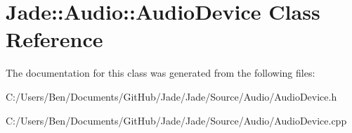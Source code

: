\hypertarget{class_jade_1_1_audio_1_1_audio_device}{}\section{Jade\+:\+:Audio\+:\+:Audio\+Device Class Reference}
\label{class_jade_1_1_audio_1_1_audio_device}


The documentation for this class was generated from the following files\+:\begin{DoxyCompactItemize}
\item 
C\+:/\+Users/\+Ben/\+Documents/\+Git\+Hub/\+Jade/\+Jade/\+Source/\+Audio/Audio\+Device.\+h\item 
C\+:/\+Users/\+Ben/\+Documents/\+Git\+Hub/\+Jade/\+Jade/\+Source/\+Audio/Audio\+Device.\+cpp\end{DoxyCompactItemize}
